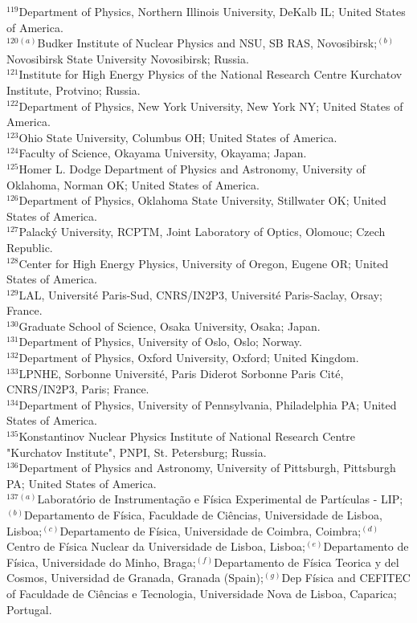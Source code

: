 \begin{flushleft}
$^{119}$Department of Physics, Northern Illinois University, DeKalb IL; United States of America.\\
$^{120}$$^{(a)}$Budker Institute of Nuclear Physics and NSU, SB RAS, Novosibirsk;$^{(b)}$Novosibirsk State University Novosibirsk; Russia.\\
$^{121}$Institute for High Energy Physics of the National Research Centre Kurchatov Institute, Protvino; Russia.\\
$^{122}$Department of Physics, New York University, New York NY; United States of America.\\
$^{123}$Ohio State University, Columbus OH; United States of America.\\
$^{124}$Faculty of Science, Okayama University, Okayama; Japan.\\
$^{125}$Homer L. Dodge Department of Physics and Astronomy, University of Oklahoma, Norman OK; United States of America.\\
$^{126}$Department of Physics, Oklahoma State University, Stillwater OK; United States of America.\\
$^{127}$Palack\'y University, RCPTM, Joint Laboratory of Optics, Olomouc; Czech Republic.\\
$^{128}$Center for High Energy Physics, University of Oregon, Eugene OR; United States of America.\\
$^{129}$LAL, Universit\'e Paris-Sud, CNRS/IN2P3, Universit\'e Paris-Saclay, Orsay; France.\\
$^{130}$Graduate School of Science, Osaka University, Osaka; Japan.\\
$^{131}$Department of Physics, University of Oslo, Oslo; Norway.\\
$^{132}$Department of Physics, Oxford University, Oxford; United Kingdom.\\
$^{133}$LPNHE, Sorbonne Universit\'e, Paris Diderot Sorbonne Paris Cit\'e, CNRS/IN2P3, Paris; France.\\
$^{134}$Department of Physics, University of Pennsylvania, Philadelphia PA; United States of America.\\
$^{135}$Konstantinov Nuclear Physics Institute of National Research Centre "Kurchatov Institute", PNPI, St. Petersburg; Russia.\\
$^{136}$Department of Physics and Astronomy, University of Pittsburgh, Pittsburgh PA; United States of America.\\
$^{137}$$^{(a)}$Laborat\'orio de Instrumenta\c{c}\~ao e F\'isica Experimental de Part\'iculas - LIP;$^{(b)}$Departamento de F\'isica, Faculdade de Ci\^{e}ncias, Universidade de Lisboa, Lisboa;$^{(c)}$Departamento de F\'isica, Universidade de Coimbra, Coimbra;$^{(d)}$Centro de F\'isica Nuclear da Universidade de Lisboa, Lisboa;$^{(e)}$Departamento de F\'isica, Universidade do Minho, Braga;$^{(f)}$Departamento de F\'isica Teorica y del Cosmos, Universidad de Granada, Granada (Spain);$^{(g)}$Dep F\'isica and CEFITEC of Faculdade de Ci\^{e}ncias e Tecnologia, Universidade Nova de Lisboa, Caparica; Portugal.\\

\end{flushleft}
